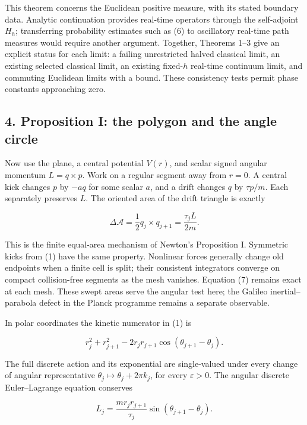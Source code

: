 \documentclass[11pt,a4paper]{article}
\begin{document}
This theorem concerns the Euclidean positive measure, with its stated
boundary data. Analytic continuation provides real-time operators
through the self-adjoint \(H_h\); transferring probability estimates
such as (6) to oscillatory real-time path measures would require another
argument. Together, Theorems 1--3 give an explicit status for each
limit: a failing unrestricted halved classical limit, an existing
selected classical limit, an existing fixed-\(h\) real-time continuum
limit, and commuting Euclidean limits with a bound. These consistency
tests permit phase constants approaching zero.

\hypertarget{proposition-i-the-polygon-and-the-angle-circle}{%
\subsection{4. Proposition I: the polygon and the angle
circle}\label{proposition-i-the-polygon-and-the-angle-circle}}

Now use the plane, a central potential \(V(r)\), and scalar signed
angular momentum \(L=q\mathbin{\times}p\). Work on a regular segment
away from \(r=0\). A central kick changes \(p\) by \(-a q\) for some
scalar \(a\), and a drift changes \(q\) by \(\tau p/m\). Each separately
preserves \(L\). The oriented area of the drift triangle is exactly

\[
\Delta\mathcal A=\frac12q_j\mathbin{\times}q_{j+1}
=\frac{\tau_j L}{2m}. \tag{7}
\]

This is the finite equal-area mechanism of Newton's Proposition I.
Symmetric kicks from (1) have the same property. Nonlinear forces
generally change old endpoints when a finite cell is split; their
consistent integrators converge on compact collision-free segments as
the mesh vanishes. Equation (7) remains exact at each mesh. These swept
areas serve the angular test here; the Galileo inertial--parabola defect
in the Planck programme remains a separate observable.

In polar coordinates the kinetic numerator in (1) is

\[
r_j^2+r_{j+1}^2-2r_jr_{j+1}\cos(\theta_{j+1}-\theta_j).
\]

The full discrete action and its exponential are single-valued under
every change of angular representative
\(\theta_j\mapsto\theta_j+2\pi k_j\), for every \(\varepsilon>0\). The
angular discrete Euler--Lagrange equation conserves

\[
L_j=\frac{m r_jr_{j+1}}{\tau_j}
\sin(\theta_{j+1}-\theta_j).
\]
\end{document}
